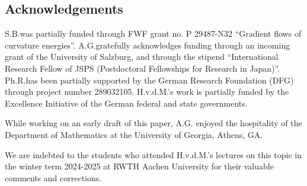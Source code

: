 \documentclass[a4paper,12pt,intlimits,ngerman]{amsart}
\numberwithin{equation}{section}
\begin{document}
%



%

\subsection*{Acknowledgements}

S.B.\@ was partially funded through FWF grant no. P 29487-N32 ``Gradient flows of curvature energies''.
A.G.\@ gratefully acknowledges funding through an incoming grant of the University
of Salzburg, and through the stipend  ``International Research Fellow of JSPS (Postdoctoral Fellowships for Research in Japan)''.
Ph.R.\@ has been partially supported by the
German Research Foundation (DFG) through project number 289032105.
H.v.d.M.\@'s work is partially funded by the Excellence Initiative of the
German federal and state governments.

While working on an early draft of this paper, A.G.\@ 
enjoyed the hospitality of the Department of Mathematics at the University of Georgia, Athens, GA.

We are indebted to the students who attended H.v.d.M.'s 
lectures
on this topic  in the winter term 2024-2025 at 
RWTH Aachen University for their valuable comments and
corrections. 



%
%
%


%
%
%
%
\end{document}

